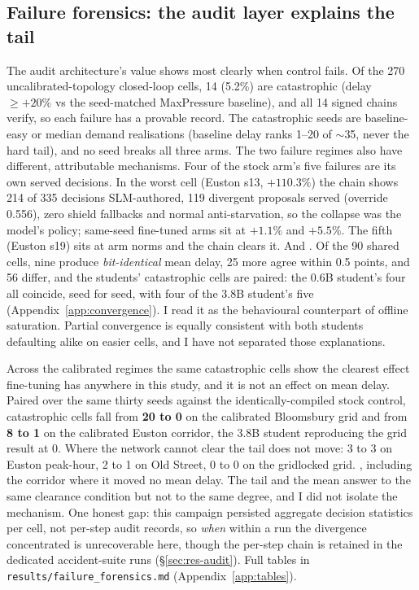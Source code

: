 \subsection{Failure forensics: the audit layer explains the tail}\label{sec:res-forensics}
The audit architecture's value shows most clearly when control fails. Of
the 270 uncalibrated-topology closed-loop cells, 14 (5.2\%) are
catastrophic (delay $\ge{+}20\%$ vs the seed-matched MaxPressure
baseline), and all 14 signed chains verify, so each failure has a provable
record. 
The catastrophic seeds are baseline-easy or median demand realisations
(baseline delay ranks 1--20 of $\sim$35, never the hard tail), and no seed
breaks all three arms. The two failure regimes also have different,
attributable mechanisms. Four of the stock arm's five failures are its own
served decisions. In the worst cell (Euston s13, $+110.3\%$) the chain
shows 214 of 335 decisions SLM-authored, 119 divergent proposals served
(override 0.556), zero shield fallbacks and normal anti-starvation, so the
collapse was the model's policy; same-seed fine-tuned arms sit at $+1.1\%$
and $+5.5\%$. The fifth (Euston s19) sits at arm norms and the chain
clears it. And . Of the 90 shared
cells, nine produce \emph{bit-identical} mean delay, 25 more agree within
0.5 points, and 56 differ, and the students' catastrophic cells are
paired: the 0.6B student's four all coincide, seed for seed, with four of
the 3.8B student's five (Appendix~\ref{app:convergence}). I read it as the
behavioural counterpart of offline saturation. Partial convergence is
equally consistent with both students defaulting alike on easier cells,
and I have not separated those explanations.

Across the calibrated regimes the same catastrophic cells show the clearest
effect fine-tuning has anywhere in this study, and it is not an effect on
mean delay. Paired over the same thirty seeds against the
identically-compiled stock control, catastrophic cells fall from
\textbf{20 to 0} on the calibrated Bloomsbury grid and from \textbf{8 to
1} on the calibrated Euston corridor, the 3.8B student reproducing the
grid result at 0. Where the network cannot clear the tail does not move: 3
to 3 on Euston peak-hour, 2 to 1 on Old Street, 0 to 0 on the gridlocked
grid. , including the corridor where it moved no mean delay. The tail and
the mean answer to the same clearance condition but not to the same
degree, and I did not isolate the mechanism. One honest gap: this campaign
persisted aggregate decision statistics per cell, not per-step audit
records, so \emph{when} within a run the divergence concentrated is
unrecoverable here, though the per-step chain is retained in the dedicated
accident-suite runs (\S\ref{sec:res-audit}). Full tables in
\texttt{results/failure\_forensics.md} (Appendix~\ref{app:tables}).
